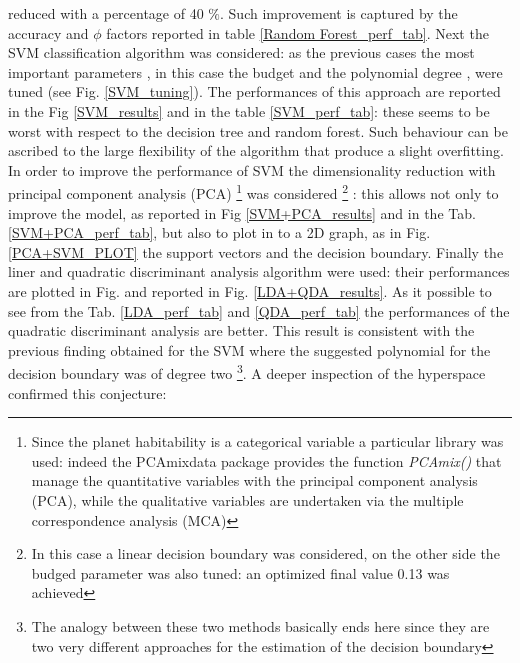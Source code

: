 \documentclass[
12pt, %
a4paper, %
oneside, %
headinclude,footinclude, %
BCOR5mm, %
]{scrartcl}
\begin{document}
reduced with a percentage of 40 $\%$. Such improvement is captured by the accuracy and $\phi$ factors reported in table \ref{Random Forest_perf_tab}. Next the SVM classification algorithm was considered: as the previous cases the most important parameters , in this case the budget and the polynomial degree , were tuned (see Fig. \ref{SVM_tuning}). The performances of this approach are reported in the Fig \ref{SVM_results} and in the table \ref{SVM_perf_tab}: these seems to be worst with respect to the decision tree and random forest. Such behaviour can be ascribed to the large flexibility of the algorithm that produce a slight overfitting. In order to improve the performance of SVM the dimensionality reduction with principal component analysis (PCA) \footnote{Since the planet habitability is a categorical variable a particular library was used: indeed the PCAmixdata package provides the function \textit{PCAmix()} that manage the quantitative variables with the principal component analysis (PCA), while the qualitative variables are undertaken via the multiple correspondence analysis (MCA)} was considered \footnote{In this case a linear decision boundary was considered, on the other side the budged parameter was also tuned: an optimized final value 0.13 was achieved} : this allows not only to improve the model, as reported in Fig \ref{SVM+PCA_results} and in the Tab. \ref{SVM+PCA_perf_tab}, but also to plot in to a 2D graph, as in Fig. \ref{PCA+SVM_PLOT} the support vectors and the decision boundary. Finally the liner and quadratic discriminant analysis algorithm were used: their performances are plotted in Fig. and reported in Fig. \ref{LDA+QDA_results}. As it possible to see from the Tab. \ref{LDA_perf_tab} and \ref{QDA_perf_tab} the performances of the quadratic discriminant analysis are better. This result is consistent with the previous finding obtained for the SVM where the suggested polynomial for the decision boundary was of degree two \footnote{The analogy between these two methods basically ends here since they are two very different approaches for the estimation of the decision boundary}. A deeper inspection of the hyperspace confirmed this conjecture: 







\clearpage
\end{document}
